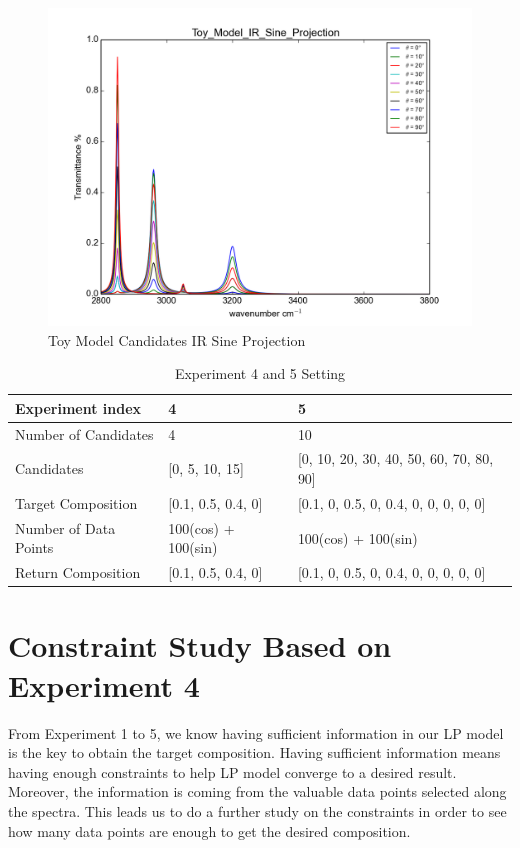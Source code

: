\begin{figure}[!ht] \label{fig:3.4}
\centering
\includegraphics[scale=0.7]{Figures/Toy_Model_IR_Sine_Projection.png} 
\caption{Toy Model Candidates IR Sine Projection} 
\end{figure}

\begin{table} \small \label{tab:3.3}
\begin{center}
\begin{tabular}{| l | p{5cm} | l |}
\hline
Experiment index & 4 & 5\\
\hline
Number of Candidates & 4 & 10 \\
\hline
Candidates & [0, 5, 10, 15] & [0, 10, 20, 30, 40, 50, 60, 70, 80, 90] \\
\hline
Target Composition & [0.1, 0.5, 0.4, 0] & [0.1, 0, 0.5, 0, 0.4, 0, 0, 0, 0, 0]\\
\hline
Number of Data Points & 100(cos) + 100(sin) & 100(cos) + 100(sin)\\
\hline
Return Composition & [0.1, 0.5, 0.4, 0] & [0.1, 0, 0.5, 0, 0.4, 0, 0, 0, 0, 0] \\
\hline
\end{tabular} 
\caption{Experiment 4 and 5 Setting}
\end{center}
\end{table}		

\section{Constraint Study Based on Experiment 4}

From Experiment 1 to 5, we know having sufficient information in our LP model is the key to obtain the target composition. Having sufficient information means having enough constraints to help LP model converge to a desired result. Moreover, the information is coming from the valuable data points selected along the spectra. This leads us to do a further study on the constraints in order to see how many data points are enough to get the desired composition.\\ 

